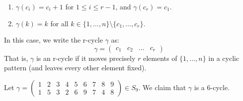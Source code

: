 \begin{itemize}
\begin{definition}
        \begin{enumerate}[label=(\alph*)]
            \item $\gamma(c_i)=c_i+1$ for $1\le i \le r-1$, and $\gamma(c_r)=c_1$.
            \item $\gamma(k)=k$ for all $k \in \{1,\dots,n\} \setminus \{c_1,\dots,c_r\}$.
        \end{enumerate}
        In this case, we write the r-cycle $\gamma$ as:
        \begin{equation}
            \gamma=\begin{pmatrix}
                c_1&c_2&\dots & c_r
            \end{pmatrix}
        \end{equation}
        That is, $\gamma$ is an r-cycle if it moves precisely $r$ elements of $\{1,\dots,n\}$ in a cyclic pattern (and leaves every other element fixed).
    \end{definition}
    \begin{example}
        Let $\gamma = \begin{pmatrix}
            1&2&3&4&5&6&7&8&9 \\ 
            1&5&3&2&6&9&7&4&8
        \end{pmatrix} \in S_9$. We claim that $\gamma$ is a 6-cycle.
        

\end{example}
\end{itemize}

